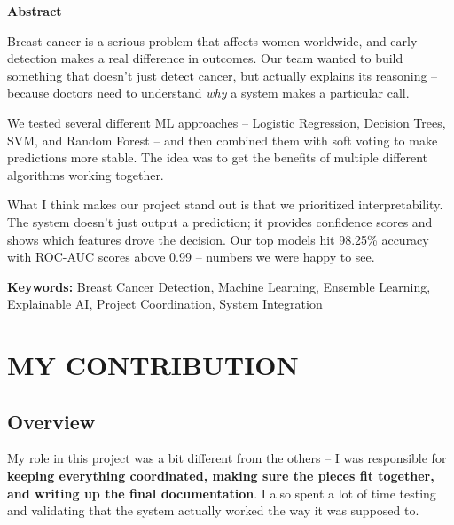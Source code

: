 \documentclass[12pt]{article}
\begin{document}
\newpage
{}
\begin{center}
    \textbf{\Large Abstract}
\end{center}

\noindent Breast cancer is a serious problem that affects women worldwide, and early detection makes a real difference in outcomes. Our team wanted to build something that doesn't just detect cancer, but actually explains its reasoning -- because doctors need to understand \textit{why} a system makes a particular call.

\vspace{0.5cm}
\noindent We tested several different ML approaches -- Logistic Regression, Decision Trees, SVM, and Random Forest -- and then combined them with soft voting to make predictions more stable. The idea was to get the benefits of multiple different algorithms working together.

\vspace{0.5cm}
\noindent What I think makes our project stand out is that we prioritized interpretability. The system doesn't just output a prediction; it provides confidence scores and shows which features drove the decision. Our top models hit 98.25\% accuracy with ROC-AUC scores above 0.99 -- numbers we were happy to see.

\vspace{0.5cm}
\noindent \textbf{Keywords:} Breast Cancer Detection, Machine Learning, Ensemble Learning, Explainable AI, Project Coordination, System Integration

\newpage
\tableofcontents

\newpage
{}
\section{MY CONTRIBUTION}

\subsection{Overview}
My role in this project was a bit different from the others -- I was responsible for \textbf{keeping everything coordinated, making sure the pieces fit together, and writing up the final documentation}. I also spent a lot of time testing and validating that the system actually worked the way it was supposed to.
\end{document}
